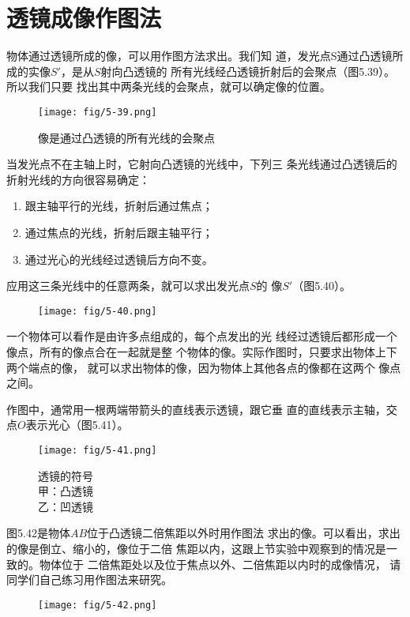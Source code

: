    \section{透镜成像作图法}
    物体通过透镜所成的像，可以用作图方法求出。我们知
    道，发光点S通过凸透镜所成的实像$S'$，是从$S$射向凸透镜的
    所有光线经凸透镜折射后的会聚点（图5.39）。所以我们只要
    找出其中两条光线的会聚点，就可以确定像的位置。
    \begin{figure}[htp]\centering
        \texttt{[image: fig/5-39.png]}
        \caption{像是通过凸透镜的所有光线的会聚点}
        \end{figure}
 
    
    当发光点不在主轴上时，它射向凸透镜的光线中，下列三
    条光线通过凸透镜后的折射光线的方向很容易确定：
    \begin{enumerate}
        \item   跟主轴平行的光线，折射后通过焦点；
        \item 通过焦点的光线，折射后跟主轴平行；
        \item 通过光心的光线经过透镜后方向不变。
    \end{enumerate}

    应用这三条光线中的任意两条，就可以求出发光点$S$的
    像$S'$（图5.40）。
    \begin{figure}[htp]\centering
        \texttt{[image: fig/5-40.png]}
        \caption{}
        \end{figure}

    一个物体可以看作是由许多点组成的，每个点发出的光
    线经过透镜后都形成一个像点，所有的像点合在一起就是整
    个物体的像。实际作图时，只要求出物体上下两个端点的像，
    就可以求出物体的像，因为物体上其他各点的像都在这两个
    像点之间。

    作图中，通常用一根两端带箭头的直线表示透镜，跟它垂
    直的直线表示主轴，交点$O$表示光心（图5.41）。
    \begin{figure}[htp]\centering
        \texttt{[image: fig/5-41.png]}
        \caption{透镜的符号\\
        甲：凸透镜\\
        乙：凹透镜}
        \end{figure}

        图5.42是物体$AB$位于凸透镜二倍焦距以外时用作图法
        求出的像。可以看出，求出的像是倒立、缩小的，像位于二倍
        焦距以内，这跟上节实验中观察到的情况是一致的。物体位于
        二倍焦距处以及位于焦点以外、二倍焦距以内时的成像情况，
        请同学们自己练习用作图法来研究。
        \begin{figure}[htp]\centering
            \texttt{[image: fig/5-42.png]}
            \caption{}
            \end{figure}

